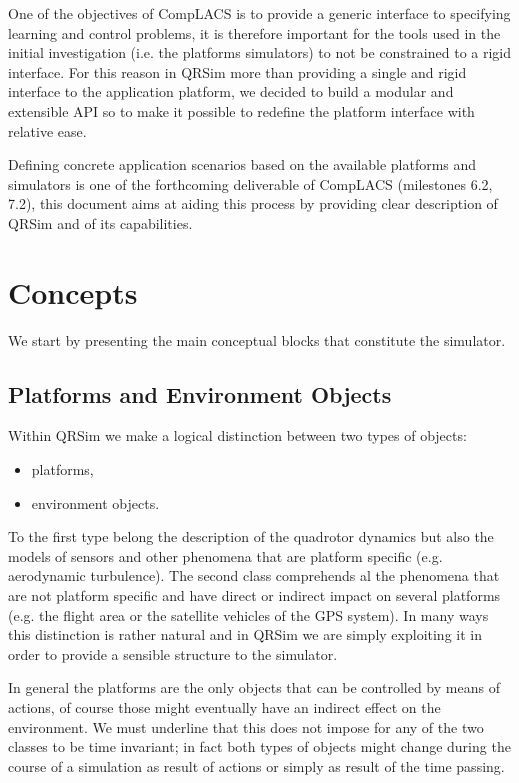 \documentclass[a4paper,11pt]{report}
\newcommand{\sname}{QRSim\xspace}
\begin{document}
One of the objectives of {CompLACS} is to provide a generic interface to specifying learning and control problems, it is therefore important for the tools used in the initial investigation (i.e. the platforms simulators) to not be constrained to a rigid interface. 
For this reason in \sname more than providing a single and rigid interface to the application platform, we decided to build a modular and extensible API so to make it possible to redefine the platform interface with relative ease. 

Defining concrete application scenarios based on the available platforms and simulators is one of the forthcoming deliverable of {CompLACS} (milestones 6.2, 7.2), this document aims at aiding this process by providing clear description of \sname and of its capabilities. 

\section{Concepts}
We start by presenting the main conceptual blocks that constitute the simulator.

\subsection{Platforms and Environment Objects}\label{sec:platandenv}
Within \sname we make a logical distinction between two types of objects:
\begin{itemize}
\item platforms,
\item environment objects.
\end{itemize}
To the first type belong the description of the quadrotor dynamics but also the models of sensors and other phenomena that are platform specific (e.g. aerodynamic turbulence). The second class comprehends al the phenomena that are not platform specific and have direct or indirect impact on several platforms (e.g. the flight area or the satellite vehicles of the GPS system).
In many ways this distinction is rather natural and in \sname we are simply exploiting it in order to provide a sensible structure to the simulator.

In general the platforms are the only objects that can be controlled by means of actions, of course those might eventually have an indirect effect on the environment. We must underline that this does not impose for any of the two classes to be time invariant; in fact both types of objects might change during the course of a simulation as result of actions or simply as result of the time passing.
\end{document}
